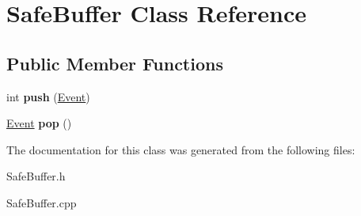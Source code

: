 \hypertarget{class_safe_buffer}{}\section{Safe\+Buffer Class Reference}
\label{class_safe_buffer}
\subsection*{Public Member Functions}
\begin{DoxyCompactItemize}
\item 
\mbox{\label{class_safe_buffer_ac3ed0799ec2e84c97e36b22c83f7abf5}} 
int {\bfseries push} (\hyperlink{class_event}{Event})
\item 
\mbox{\label{class_safe_buffer_a90a33fca4d838f7c0eef6e8557f3c281}} 
\hyperlink{class_event}{Event} {\bfseries pop} ()
\end{DoxyCompactItemize}


The documentation for this class was generated from the following files\+:\begin{DoxyCompactItemize}
\item 
Safe\+Buffer.\+h\item 
Safe\+Buffer.\+cpp\end{DoxyCompactItemize}
